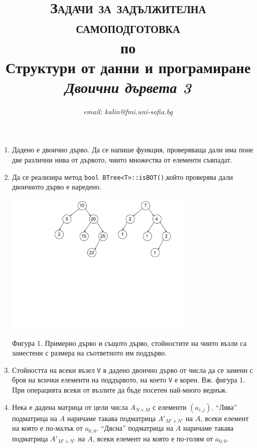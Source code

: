 \documentclass[12pt,a4paper]{article}
\author{\textit{email: kalin@fmi.uni-sofia.bg}}
\title{\textsc{Задачи за задължителна самоподготовка} \\
по \\
Структури от данни и програмиране\\
\textit{Двоични дървета 3}}
\begin{document}
\maketitle


\begin{enumerate}

	\item Дадено е двоично дърво. Да се напише функция, проверяваща дали има поне две различни нива от дървото, чиито множества от елементи съвпадат.

	\item Да се реализира метод \texttt{bool BTree<T>::isBOT()},който проверява дали двоичното дърво е наредено.


	\begin{flushleft}
	\includegraphics[width=9cm]{images/tree1}

	\vspace{-100px}

	Фигура 1. Примерно дърво и същото дърво, стойностите на чиито възли са заместени с размера на съответното им поддърво.
	\end{flushleft}

	\item Стойността на всеки възел \texttt{V} в дадено двоично дърво от числа да се замени с броя на всички елементи на поддървото, на което \texttt{V} е корен. Вж. фигура 1. При операцията всеки от възлите да бъде посетен най-много веднъж.

	\item Нека е дадена матрица от цели числа $A_{N\times M}$ с елементи $(a_{i,j})$. ``Лява'' подматрица на $A$ наричаме такава подматрица $A'_{M'\times N'}$ на $A$, всеки елемент на която е по-малък от $a_{0,0}$. ``Дясна'' подматрица на $A$ наричаме такава подматрица $A'_{M'\times N'}$ на $A$, всеки елемент на която е по-голям от $a_{0,0}$.



\end{enumerate}
\end{document}
